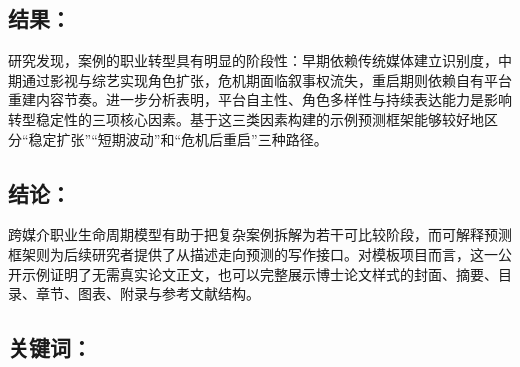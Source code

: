 \begin{titlepage}
    \subsection*{结果：}
    研究发现，案例的职业转型具有明显的阶段性：早期依赖传统媒体建立识别度，中期通过影视与综艺实现角色扩张，危机期面临叙事权流失，重启期则依赖自有平台重建内容节奏。进一步分析表明，平台自主性、角色多样性与持续表达能力是影响转型稳定性的三项核心因素。基于这三类因素构建的示例预测框架能够较好地区分“稳定扩张”“短期波动”和“危机后重启”三种路径。

    \subsection*{结论：}
    跨媒介职业生命周期模型有助于把复杂案例拆解为若干可比较阶段，而可解释预测框架则为后续研究者提供了从描述走向预测的写作接口。对模板项目而言，这一公开示例证明了无需真实论文正文，也可以完整展示博士论文样式的封面、摘要、目录、章节、图表、附录与参考文献结构。

    \subsection*{关键词：}
    \begin{flushleft}
        \hspace{1em}
    \end{flushleft}

\clearpage{\cleardoublepage}
\end{titlepage}

